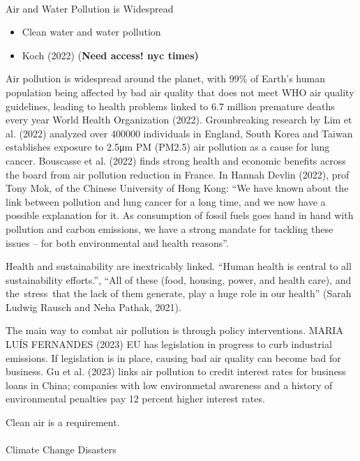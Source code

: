 \documentclass[
  letterpaper,
  DIV=11,
  numbers=noendperiod]{scrartcl}
\makeatletter
\let\oldparagraph\paragraph
\renewcommand{\paragraph}{
    \@ifstar
      \xxxParagraphStar
      \xxxParagraphNoStar
  }
\newcommand{\xxxParagraphStar}[1]{\oldparagraph*{#1}\mbox{}}
\newcommand{\xxxParagraphNoStar}[1]{\oldparagraph{#1}\mbox{}}
\providecommand{\tightlist}{%
  \setlength{\itemsep}{0pt}\setlength{\parskip}{0pt}}\usepackage{longtable,booktabs,array}
\makeatother
\begin{document}
\paragraph{Air and Water Pollution is
Widespread}\label{air-and-water-pollution-is-widespread}

\begin{itemize}
\tightlist
\item
  Clean water and water pollution
\item
  Koch (2022) (\textbf{Need access! nyc times)}
\end{itemize}

Air pollution is widespread around the planet, with 99\% of Earth's
human population being affected by bad air quality that does not meet
WHO air quality guidelines, leading to health problems linked to 6.7
million premature deaths every year World Health Organization (2022).
Grounbreaking research by Lim et al. (2022) analyzed over 400000
individuals in England, South Korea and Taiwan establishes exposure to
2.5μm PM (PM2.5) air pollution as a cause for lung cancer. Bouscasse et
al. (2022) finds strong health and economic benefits across the board
from air pollution reduction in France. In Hannah Devlin (2022), prof
Tony Mok, of the Chinese University of Hong Kong: ``We have known about
the link between pollution and lung cancer for a long time, and we now
have a possible explanation for it. As consumption of fossil fuels goes
hand in hand with pollution and carbon emissions, we have a strong
mandate for tackling these issues -- for both environmental and health
reasons''.

Health and sustainability are inextricably linked. ``Human health is
central to all sustainability efforts.'', ``All of these (food, housing,
power, and health care), and the~stress~that the lack of them generate,
play a huge role in our health'' (Sarah Ludwig Rausch and Neha Pathak,
2021).

The main way to combat air pollution is through policy interventions.
MARIA LUÍS FERNANDES (2023) EU has legislation in progress to curb
industrial emissions. If legislation is in place, causing bad air
quality can become bad for business. Gu et al. (2023) links air
pollution to credit interest rates for business loans in China;
companies with low environmetal awareness and a history of environmental
penalties pay 12 percent higher interest rates.

Clean air is a requirement.

\paragraph{Climate Change Disasters}\label{climate-change-disasters}
\end{document}
